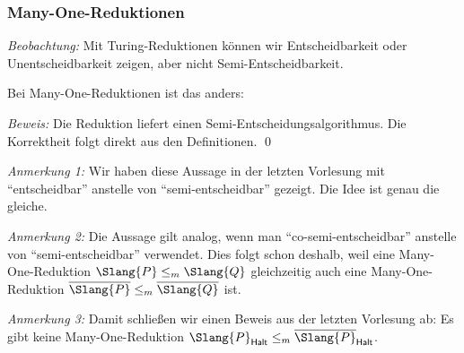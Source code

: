 \documentclass[aspectratio=1610,onlymath]{beamer}
\begin{document}
\begin{frame}\frametitle{Many-One-Reduktionen}

\emph{Beobachtung:} Mit Turing-Reduktionen können wir Entscheidbarkeit oder Unentscheidbarkeit zeigen, aber nicht Semi-Entscheidbarkeit.\medskip

Bei Many-One-Reduktionen ist das anders:


\pause\emph{Beweis:} Die Reduktion liefert einen Semi-Entscheidungs\-algorithmus.
Die Korrektheit folgt direkt aus den Definitionen.
\qed\bigskip

\emph{Anmerkung 1:} Wir haben diese Aussage in der letzten Vorlesung mit "`entscheidbar"' anstelle
von "`semi-entscheidbar"' gezeigt. Die Idee ist genau die gleiche.

\emph{Anmerkung 2:} Die Aussage gilt analog, wenn man "`co-semi-entscheidbar"' anstelle
von "`semi-entscheidbar"' verwendet. Dies folgt schon deshalb, weil eine Many-One-Reduktion
$\Slang{P}\leq_m \Slang{Q}$ gleichzeitig auch eine Many-One-Reduktion $\overline{\Slang{P}}\leq_m \overline{\Slang{Q}}$ ist.


\emph{Anmerkung 3:} Damit schließen wir einen Beweis aus der letzten Vorlesung ab: Es gibt keine Many-One-Reduktion $\Slang{P}_{\textsf{Halt}}\leq_m \overline{\Slang{P}}_{\textsf{Halt}}$.

\end{frame}

% 
% 


\end{document}
